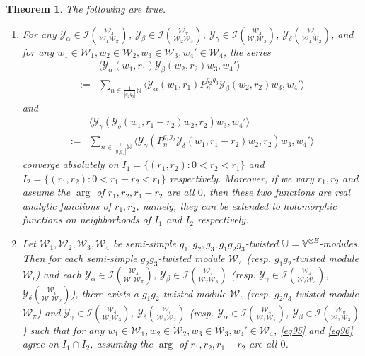 \documentclass[12pt,a4paper,notitlepage]{article}
\theoremstyle{definition}
\theoremstyle{plain}
\newtheorem{thm}[df]{Theorem}
\newcommand{\mc}{\mathcal}
\newcommand{\bk}[1]{\langle {#1}\rangle}
\newcommand{\Vbb}{\mathbb V}
\newcommand{\Ubb}{\mathbb U}
\newcommand{\Nbb}{\mathbb N}
\numberwithin{equation}{subsection}
\begin{document}
\begin{thm}\label{lb63}
The following are true.
\begin{enumerate}
\item For any $\mc Y_\alpha\in\mc I{\mc W_4\choose \mc W_1\mc W_\pi}$, $\mc Y_\beta\in\mc I{\mc W_\pi\choose\mc W_2\mc W_3}$, $\mc Y_\gamma\in\mc I{\mc W_4\choose\mc W_\iota\mc W_3}$, $\mc Y_\delta{\mc W_\iota\choose\mc W_1\mc W_2}$, and for any $w_1\in\mc W_1,w_2\in\mc W_2,w_3\in\mc W_3,w_4'\in\mc W_4$, the series
\begin{align}
&\bk{\mc Y_\alpha(w_1,r_1)\mc Y_\beta(w_2,r_2)w_3,w_4'}\nonumber\\
:=&\sum_{n\in\frac 1{|g_2g_3|}\Nbb}\bk{\mc Y_\alpha(w_1,r_1)P_n^{g_2g_3}\mc Y_\beta(w_2,r_2)w_3,w_4'}\label{eq95}
\end{align}
and
\begin{align}
&\bk{\mc Y_\gamma(\mc Y_\delta(w_1,r_1-r_2)w_2,r_2)w_3,w_4'}\nonumber\\
:=&\sum_{n\in\frac 1{|g_1g_2|}\Nbb}\bk{\mc Y_\gamma(P_n^{g_1g_2}\mc Y_\delta(w_1,r_1-r_2)w_2,r_2)w_3,w_4'}\label{eq96}
\end{align}
converge absolutely on $I_1=\{(r_1,r_2):0<r_2<r_1\}$ and  $I_2=\{(r_1,r_2):0<r_1-r_2<r_1\}$ respectively. Moreover, if we vary $r_1,r_2$ and assume the $\arg$ of $r_1,r_2,r_1-r_2$ are all $0$, then these two functions are real analytic functions of  $r_1,r_2$, namely, they can be extended to holomorphic functions on neighborhoods of $I_1$ and $I_2$ respectively.

\item Let $\mc W_1,\mc W_2,\mc W_3,\mc W_4$ be semi-simple $g_1,g_2,g_3,g_1g_2g_3$-twisted $\Ubb=\Vbb^{\otimes E}$-modules. Then for each semi-simple $g_2g_3$-twisted module $\mc W_\pi$ (resp. $g_1g_2$-twisted module $\mc W_\iota$) and each $\mc Y_\alpha\in\mc I{\mc W_4\choose \mc W_1\mc W_\pi}$, $\mc Y_\beta\in\mc I{\mc W_\pi\choose\mc W_2\mc W_3}$ (resp. $\mc Y_\gamma\in\mc I{\mc W_4\choose\mc W_\iota\mc W_3}$, $\mc Y_\delta{\mc W_\iota\choose\mc W_1\mc W_2}$), there exists a $g_1g_2$-twisted module $\mc W_\iota$ (resp. $g_2g_3$-twisted module $\mc W_\pi$) and $\mc Y_\gamma\in\mc I{\mc W_4\choose\mc W_\iota\mc W_3}$, $\mc Y_\delta{\mc W_\iota\choose\mc W_1\mc W_2}$ (resp. $\mc Y_\alpha\in\mc I{\mc W_4\choose \mc W_1\mc W_\pi}$, $\mc Y_\beta\in\mc I{\mc W_\pi\choose\mc W_2\mc W_3}$) such that for any $w_1\in\mc W_1,w_2\in\mc W_2,w_3\in\mc W_3,w_4'\in\mc W_4$, \eqref{eq95} and \eqref{eq96} agree on $I_1\cap I_2$, assuming the $\arg$ of $r_1,r_2,r_1-r_2$ are all $0$.
\end{enumerate}
\end{thm}
\end{document}
